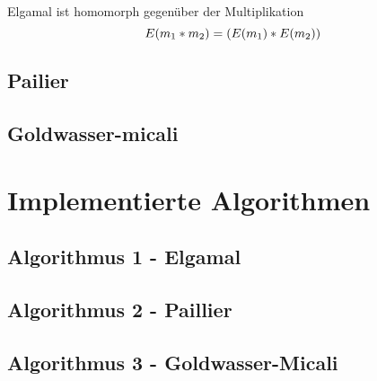 Elgamal ist homomorph gegenüber der Multiplikation
$$ E(m \textsubscript{1} * m \textsubscript{2}) = (E(m \textsubscript{1}) * E(m \textsubscript{2}))$$

\subsection{Pailier}
\label{sec:Sec1.3.2}



\subsection{Goldwasser-micali}
\label{sec:Sec1.3.3}

\section{Implementierte Algorithmen}

\subsection{Algorithmus 1 - Elgamal}
\label{sec:Sec2.2}

\subsection{Algorithmus 2 - Paillier}
\label{sec:Sec2.3}


\subsection{Algorithmus 3 - Goldwasser-Micali}
\label{sec:Sec2.4}